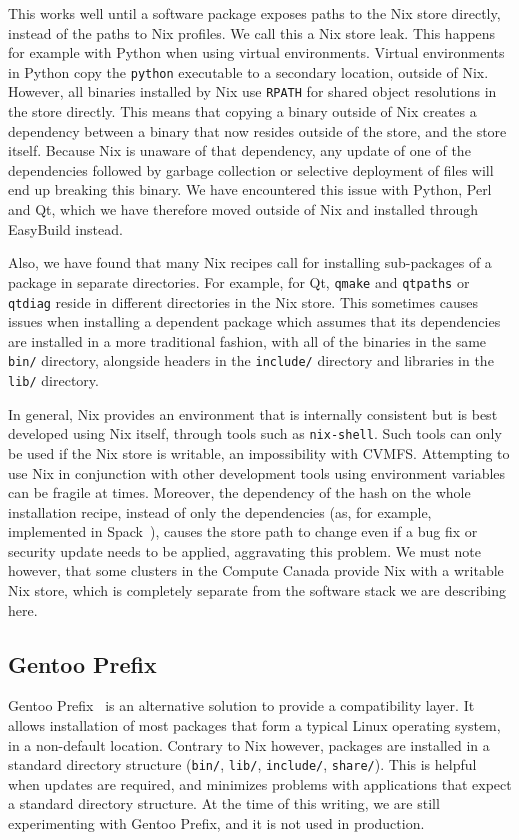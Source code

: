\documentclass[sigconf]{acmart}
\begin{document}
This works well until a software package exposes paths to the Nix store directly, instead of the paths to Nix profiles. We call this a Nix store leak. This happens for example with Python when using virtual environments. Virtual environments in Python copy the \texttt{python} executable to a secondary location, outside of Nix. However, all binaries installed by Nix use \texttt{RPATH} for shared object resolutions in the store directly. This means that copying a binary outside of Nix creates a dependency between a binary that now resides outside of the store, and the store itself. Because Nix is unaware of that dependency, any update of one of the dependencies followed by garbage collection or selective deployment of files will end up breaking this binary. We have encountered this issue with Python, Perl and Qt, which we have therefore moved outside of Nix and installed through EasyBuild instead.

Also, we have found that many Nix recipes call for installing sub-packages of a package in separate directories. For example, for Qt, \texttt{qmake} and \texttt{qtpaths} or \texttt{qtdiag} reside in different directories in the Nix store. This sometimes causes issues when installing a dependent package which assumes that its dependencies are installed in a more traditional fashion, with all of the binaries in the same \texttt{bin/} directory, alongside headers in the \texttt{include/} directory and libraries in the \texttt{lib/} directory.

In general, Nix provides an environment that is internally consistent but is best developed using Nix itself, through tools such as \texttt{nix-shell}. Such tools can only be used if the Nix store is writable, an impossibility with CVMFS. Attempting to use Nix in conjunction with other development tools using environment variables can be fragile at times. Moreover, the dependency of the hash on the whole installation recipe, instead of only the dependencies (as, for example, implemented in Spack~\cite{Spack}), causes the store path to change even if a bug fix or security update needs to be applied, aggravating this problem. We must note however, that some clusters in the Compute Canada provide Nix with a writable Nix store, which is completely separate from the software stack we are describing here.

\subsection{Gentoo Prefix}
\label{sub:Gentoo_Prefix}
Gentoo Prefix~\cite{Gentoo} is an alternative solution to provide a compatibility layer. It allows installation of most packages that form a typical Linux operating system, in a non-default location. Contrary to Nix however, packages are installed in a standard directory structure (\texttt{bin/}, \texttt{lib/}, \texttt{include/}, \texttt{share/}). This is helpful when updates are required, and minimizes problems with applications that expect a standard directory structure. At the time of this writing, we are still experimenting with Gentoo Prefix, and it is not used in production. 
\end{document}

